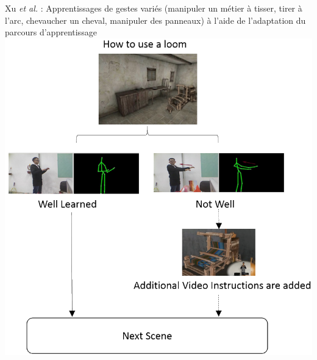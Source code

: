     \begin{frame}{\secname}
         Xu \textit{et al.} : Apprentissages de gestes variés (manipuler un métier à tisser, tirer à l’arc, chevaucher un cheval, manipuler des panneaux) à l'aide de l'adaptation du parcours d'apprentissage \\
        \centering
        \includegraphics[scale=0.3]{img/eiah_xu.png}
    \end{frame}
    
